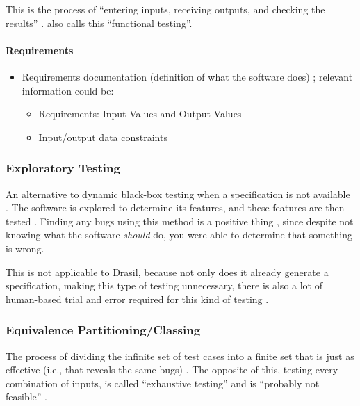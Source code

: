 This is the process of ``entering inputs, receiving outputs, and checking the
results'' \cite[p.~64]{patton_software_2006}. \cite{van_vliet_software_2000}
also calls this ``functional testing''.

\paragraph{Requirements}
\begin{itemize}
      \item Requirements documentation (definition of what the software does)
            \cite[p.~64]{patton_software_2006}; relevant information could be:
            \begin{itemize}
                  \item Requirements: Input-Values and Output-Values
                  \item Input/output data constraints
            \end{itemize}
\end{itemize}

\subsubsection{Exploratory Testing \cite[p.~65]{patton_software_2006}}

An alternative to dynamic black-box testing when a specification is not
available \cite[p.~65]{patton_software_2006}. The software is explored to
determine its features, and these features are then tested
\cite[p.~65]{patton_software_2006}. Finding any bugs using this method is a
positive thing \cite[p.~65]{patton_software_2006}, since despite not knowing
what the software \emph{should} do, you were able to determine that something
is wrong.

This is not applicable to Drasil, because not only does it already generate a
specification, making this type of testing unnecessary, there is also a lot of
human-based trial and error required for this kind of testing
\cite{june_11_meeting}.

\subsubsection{Equivalence Partitioning/Classing \cite[p.~67-69]{patton_software_2006}}

The process of dividing the infinite set of test cases into a finite set that is
just as effective (i.e., that reveals the same bugs) \cite[p.~67]{patton_software_2006}.
The opposite of this, testing every combination of inputs, is called
``exhaustive testing'' and is ``probably not feasible''
\cite[p.~461]{peters_software_2000}.

